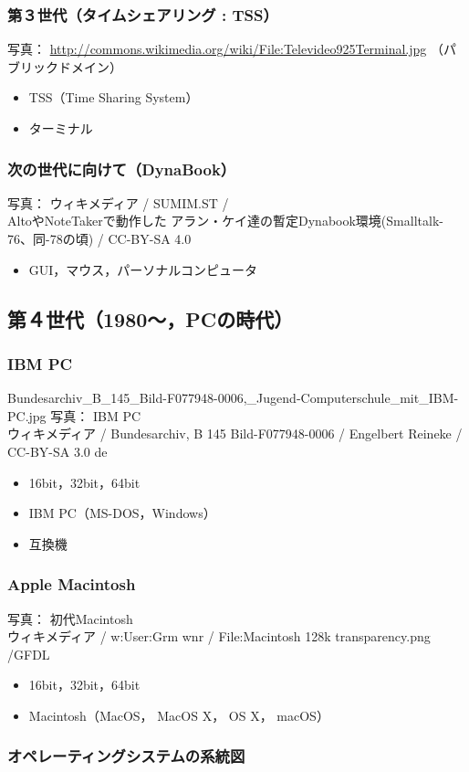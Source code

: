 \documentclass[nomag]{beamer}                   %
\begin{document}
\begin{frame}
  \frametitle{第３世代（タイムシェアリング : TSS）}
  {\tiny 写真：
      \url{http://commons.wikimedia.org/wiki/File:Televideo925Terminal.jpg}
（パブリックドメイン）}
  \begin{itemize}
    \item TSS（Time Sharing System）
    \item ターミナル
  \end{itemize}
\end{frame}

\begin{frame}
  \frametitle{次の世代に向けて（DynaBook）}
        {\tiny 写真： ウィキメディア /  SUMIM.ST / \\
          AltoやNoteTakerで動作した
          アラン・ケイ達の暫定Dynabook環境(Smalltalk-76、同-78の頃) /
          CC-BY-SA 4.0}
  \begin{itemize}
    \item GUI，マウス，パーソナルコンピュータ
  \end{itemize}
\end{frame}

\subsection{第４世代（1980〜，PCの時代）}
\begin{frame}
  \frametitle{IBM PC}
{Bundesarchiv_B_145_Bild-F077948-0006,_Jugend-Computerschule_mit_IBM-PC.jpg}
      {\tiny
          写真： IBM PC \\
          ウィキメディア /
          Bundesarchiv, B 145 Bild-F077948-0006 /
          Engelbert Reineke / CC-BY-SA 3.0 de
      }
  \begin{itemize}
    \item 16bit，32bit，64bit
    \item IBM PC（MS-DOS，Windows）
    \item 互換機
  \end{itemize}
\end{frame}

\begin{frame}
  \frametitle{Apple Macintosh}
      {\tiny
          写真： 初代Macintosh \\
          ウィキメディア / w:User:Grm wnr / 
          File:Macintosh 128k transparency.png /GFDL
      }
  \begin{itemize}
    \item 16bit，32bit，64bit
    \item Macintosh（MacOS， MacOS X， OS X， macOS）
  \end{itemize}
\end{frame}

\begin{frame}
  \frametitle{オペレーティングシステムの系統図}
\end{frame}
\end{document}
